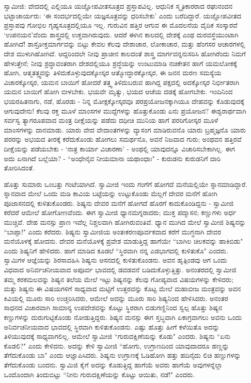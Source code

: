 ಸ್ವಾಮೀಜಿ: ವೇದದಲ್ಲಿ ಎಲ್ಲಿಯೂ ಯಜ್ಞೋಪವೀತಸೂತ್ರದ ಪ್ರಸ್ತಾಪವಿಲ್ಲ. ಆಧುನಿಕ ಸ್ಮೃತಿಕಾರರಾದ ರಘುನಂದನ ಭಟ್ಟಾಚಾರ್ಯರು: ‘ಈ ಸಂದರ್ಭದಲ್ಲಿಯೇ ಯಜ್ಞಸೂತ್ರವನ್ನು ಧರಿಸಬೇಕು’ ಎಂದು ಬರೆದಿದ್ದಾರೆ. ಯಜ್ಞೋಪವೀತದ ಪ್ರಸ್ತಾಪವು ಗೋಭಿಲ ಗೃಹ್ಯಸೂತ್ರದಲ್ಲಿಯೂ ಇಲ್ಲ. ಗುರುವಿನ ಹತ್ತಿರ ಆಗುವ ಈ ಮೊದಲನೆಯ ವೈದಿಕ ಸಂಸ್ಕಾರವೆ ‘ಉಪನಯನ’ವೆಂದು ಶಾಸ್ತ್ರದಲ್ಲಿ ಉಕ್ತವಾಗಿರುವುದು. ಆದರೆ ಈಗಿನ ಕಾಲದಲ್ಲಿ ದೇಶಕ್ಕೆ ಎಂಥ ದುರವಸ್ಥೆಯುಂಟಾಗಿ ಹೋಗಿದೆ! ಶಾಸ್ರೋಕ್ತಮಾರ್ಗವನ್ನು ಬಿಟ್ಟು ಕೇವಲ ಕೆಲವು ದೇಶಾಚಾರ, ಲೋಕಾಚಾರ, ಮತ್ತು ಹೆಂಗಸರ ಆಚಾರಗಳಲ್ಲಿ ದೇಶ ಮುಳುಗಿಹೋಗಿದೆ. ಆದ್ದರಿಂದಲೇ ನೀವು ಪ್ರಾಚೀನ ಕಾಲದಂತೆ ಶಾಸ್ತ್ರ ಮಾರ್ಗವನ್ನನುಸರಿಸಿ ಹೋಗಿರೆಂದು ನಿಮಗೆ ಹೇಳುತ್ತೇನೆ; ನೀವು ಶ್ರದ್ಧಾವಂತರಾಗಿ ದೇಶದಲ್ಲಿಯೂ ಶ್ರದ್ಧೆಯನ್ನು ಉಂಟುಮಾಡಿ ನಚಿಕೇತನ ಹಾಗೆ ಯಮಲೋಕಕ್ಕೆ ಹೋಗಿ, ಆತ್ಮತತ್ತ್ವವನ್ನು ತಿಳಿದುಕೊಳ್ಳುವುದಕ್ಕೋಸ್ಕರ ಆತ್ಮೋದ್ಧಾರಕ್ಕೋಸ್ಕರ, ಈ ಜನನ ಮರಣ ಸಮಸ್ಯೆಯ ವಿಚಾರಕ್ಕೋಸ್ಕರ, ಯಮನ ಬಾಯಿಗೆ ಹೋದರೆ ತತ್ತ್ವ ತಿಳಿದುಬರುವ ಹಾಗಿದ್ದ ಪಕ್ಷದಲ್ಲಿ ಅದಕ್ಕೋಸ್ಕರ ನಿರ್ಭೀತರಾಗಿ ಯಮನ ಬಾಯಿಗೆ ಹೋಗಿ ಬೀಳಬೇಕು. ಭಯವೇ ಮೃತ್ಯು, ಭಯದ ಆಚೆಯ ದಡಕ್ಕೆ ಹೋಗಬೇಕು. ಇಂದಿನಿಂದ ಭಯರಹಿತನಾಗು, ನಡೆ, ಹೊರಡು - ನಿನ್ನ ಮೋಕ್ಷಕ್ಕೋಸ್ಕರವೂ ಪರಪ್ರಯೋಜನಕ್ಕಾಗಿಯೂ ದೇಹವನ್ನು ಕೊಡುವುದಕ್ಕೆ ಆಗುವುದೇನು! ಕೆಲವು ರಕ್ತ ಮೂಳೆ ಮಾಂಸಗಳ ಮುದ್ದೆಗಳನ್ನು ಹೊತ್ತುಕೊಂಡು ಏನು ಪ್ರಯೋಜನ? ಈಶ್ವರಾರ್ಥವಾಗಿ ಸರ್ವಸ್ವ ತ್ಯಾಗರೂಪವಾದ ಮಂತ್ರ ದೀಕ್ಷೆಯನ್ನು ಪಡೆದು ದಧೀಚಿ ಮುನಿಯ ಹಾಗೆ ಪರರಿಗೋಸ್ಕರ ಮೂಳೆ ಮಾಂಸಗಳನ್ನು ದಾನಮಾಡು. ಯಾರು ವೇದ ವೇದಾಂತಗಳನ್ನು ವ್ಯಾಸಂಗ ಮಾಡಿರುವನೊ ಯಾರು ಬ್ರಹ್ಮಜ್ಞನೊ ಯಾರು ಪರರನ್ನು ಅಭಯದ ತೀರಕ್ಕೆ ಕರೆದುಕೊಂಡು ಹೋಗಲು ಸಮರ್ಥನೊ, ಅವನೆ ನಿಜವಾದ ಗುರು; ಅಂಥವನ ಹತ್ತಿರವೆ ದೀಕ್ಷೆಯನ್ನು ಪಡೆಯಬೇಕು - ‘ನಾತ್ರ ಕಾರ್ಯಾ ವಿಚಾರಣಾ’ - ಅಂಥಲ್ಲಿ ಯಾವುದನ್ನೂ ವಿಚಾರಿಸಬೇಕಾಗಿಲ್ಲ. ಈಗ ಅದು ಏನಾಗಿದೆ ಬಲ್ಲೆಯಾ? - “ಅಂಧೇನೈವ ನೀಯಮಾನಾ ಯಥಾಂಧಾಃ" - ಕುರುಡನು ಕುರುಡನಿಗೆ ದಾರಿ ತೋರಿಸಿದಂತೆ.

ಹೊತ್ತು ಸುಮಾರು ಒಂಬತ್ತು ಗಂಟೆಯಾಗಿದೆ. ಸ್ವಾಮೀಜಿ ಇಂದು ಗಂಗೆಗೆ ಹೋಗದೆ ಮನೆಯಲ್ಲಿಯೇ ಸ್ನಾನಮಾಡಿದ್ದಾರೆ. ಸ್ನಾನವಾದ ಮೇಲೆ ಒಂದು ಮಡಿ ಕಾವಿಯ ಬಟ್ಟೆಯನ್ನು ಉಟ್ಟುಕೊಂಡು ಮೆಲ್ಲಗೆ ದೇವರ ಮನೆಗೆ ಹೋಗಿ ಪೂಜಾಸನದಲ್ಲಿ ಕುಳಿತುಕೊಂಡರು. ಶಿಷ್ಯನು ದೇವರ ಮನೆಗೆ ಹೋಗದೆ ಹೊರಗೆ ಕಾದುಕೊಂಡಿದ್ದನು - ಸ್ವಾಮೀಜಿ ಕರೆದರೆ ಆಮೇಲೆ ಹೋಗೋಣವೆಂದು. ಈಗ ಸ್ವಾಮೀಜಿ ಧ್ಯಾನಮಗ್ನರಾದರು; ಮುಕ್ತ ಪದ್ಮಾಸನ; ಕಣ್ಣುಗಳು ಅರ್ಧ ಮುಚ್ಚಿವೆ. ದೇಹ ಮನಸ್ಸು ಪ್ರಾಣ ಇವೆಲ್ಲ ನಿಶ್ಚಲವಾಗಿ ಹೋಗಿರುವಂತಿವೆ. ಧ್ಯಾನ ಮುಗಿದ ಮೇಲೆ ಸ್ವಾಮೀಜಿ ಶಿಷ್ಯನನ್ನು “ಬಾಪ್ಪಾ!" ಎಂದು ಕರೆದರು. ಶಿಷ್ಯನು ಸ್ವಾಮೀಜಿಯ ಅಂತಃಕರಣಪೂರ್ವಕವಾದ ಕರೆಗೆ ಮುಗ್ಧನಾಗಿ ದೇವರ ಮನೆಯೊಳಕ್ಕೆ ಹೋದನು. ದೇವರ ಮನೆಯೊಳಕ್ಕೆ ಪ್ರವೇಶ ಮಾಡುತ್ತಿದ್ದ ಹಾಗೆಯೇ “ಬಾಗಿಲ ಚಿಲಕವನ್ನು ಹಾಕಿಬಿಡು" ಎಂದು ಶಿಷ್ಯನಿಗೆ ಹೇಳಿದರು. ಹಾಗೆ ಮಾಡಿದ ಕೂಡಲೆ “ಸ್ಥಿರವಾಗಿ ನನ್ನ ಎಡಭಾಗದಲ್ಲಿ ಕುಳಿತುಕೊ" ಎಂದರು. ಸ್ವಾಮಿಗಳ ಆಜ್ಞೆಯನ್ನು ಶಿರಸಾವಹಿಸಿ ಶಿಷ್ಯನು ಆಸನದಲ್ಲಿ ಕುಳಿತುಕೊಂಡನು. ಅವನ ಹೃತ್ಪಿಂಡವು ಆಗ ಒಂದು ವಿಧವಾದ ಅನಿರ್ವಚನೀಯವಾದ ಅಪೂರ್ವ ಭಾವದಲ್ಲಿ ಡವಡವನೆ ಬಡಿದುಕೊಳ್ಳುತ್ತಿತ್ತು. ಅನಂತರದಲ್ಲಿ ಸ್ವಾಮೀಜಿ ತಮ್ಮ ಕರಕಮಲವನ್ನು ಶಿಷ್ಯನ ತಲೆಯ ಮೇಲೆ ಇಟ್ಟು ಶಿಷ್ಯನನ್ನು ಕೆಲವು ಗೋಪ್ಯವಾದ ವಿಷಯಗಳನ್ನು ಕೇಳಿದರು; ಮತ್ತು ಶಿಷ್ಯನು ಈ ವಿಷಯಗಳಿಗೆ ಸಾಧ್ಯವಾದ ಮಟ್ಟಿಗೆ ಉತ್ತರವನ್ನು ಕೊಟ್ಟ ಮೇಲೆ ಮಹಾಬೀಜ ಮಂತ್ರವನ್ನು ಅವನ ಕಿವಿಯಲ್ಲಿ ಮೂರು ಸಾರಿ ಉಚ್ಚರಿಸಿದರು, ಆಮೇಲೆ ಅದನ್ನು ಮೂರು ಸಾರಿ ಶಿಷ್ಯನಿಂದ ಹೇಳಿಸಿದರು. ಅನಂತರ ಸಾಧನದ ವಿಚಾರವಾಗಿ ಸಾಮಾನ್ಯ ಉಪದೇಶವನ್ನು ಕೊಟ್ಟು ಸ್ಥಿರರಾಗಿ ಬಿಡುಗಣ್ಣಿನಿಂದ ಸ್ವಲ್ಪ ಹೊತ್ತು ಶಿಷ್ಯನ ಕಣ್ಣುಗಳನ್ನು ದುರುಗುಟ್ಟಿಕೊಂಡು ನೋಡುತ್ತಿದ್ದರು. ಶಿಷ್ಯನ ಮನಸ್ಸು ಈಗ ಸ್ತಬ್ಧವಾಗಿ ಏಕಾಗ್ರವಾಗಲು ಅವನು ಒಂದು ಅನಿರ್ವಚನೀಯವಾದ ಭಾವದಲ್ಲಿ ಸ್ಥಿರವಾಗಿ ಕುಳಿತುಕೊಂಡನು. ಎಷ್ಟು ಹೊತ್ತು ಹೀಗೆ ಕಳೆಯಿತೊ ಅದನ್ನು ತಿಳಿಯುವುದಕ್ಕೆ ಸಾಧ್ಯವಾಗಲಿಲ್ಲ. ಆಮೇಲೆ ಸ್ವಾಮೀಜಿ “ಗುರುದಕ್ಷಿಣೆಯನ್ನು ಕೊಡು" ಎಂದರು. ಶಿಷ್ಯನು “ಏನು ಕೊಡಲಿ?" ಎಂದು ಕೇಳಿದನು. ಅದನ್ನು ಕೇಳಿ ಸ್ವಾಮೀಜಿ “ಹೋಗು, ಉಗ್ರಾಣದಿಂದ ಯಾವುದಾದರೂ ಹಣ್ಣನ್ನು ತೆಗೆದುಕೊಂಡು ಬಾ" ಎಂದು ಆಜ್ಞಾಪಿಸಿದರು. ಶಿಷ್ಯನು ಉಗ್ರಾಣಕ್ಕೆ ಓಡಿಹೋಗಿ ಹತ್ತು ಹದಿನೈದು ಲಿಚಿ ಹಣ್ಣುಗಳನ್ನು ತೆಗೆದುಕೊಂಡು ಬಂದನು. ಸ್ವಾಮಿಜಿ ಕೈಗೆ ಅದನ್ನು ಕೊಡುತ್ತಿದ್ದ ಹಾಗೆಯೆ ಅವರು ಹಾಗೆಯೆ ಅವುಗಳನ್ನೆಲ್ಲಾ ಒಂದೊಂದಾಗಿ ತಿಂದುಬಿಟ್ಟು “ನೀನು ಗುರುದಕ್ಷಿಣೆಯನ್ನು ಕೊಟ್ಟು ಆಯಿತು, ನಡೆ!" ಎಂದರು.

